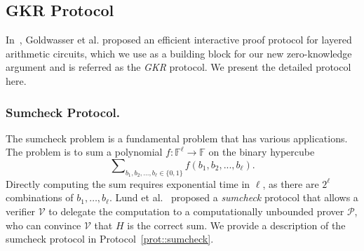 
\subsection{GKR Protocol}\label{subsec::GKR}

In~\cite{GKR}, Goldwasser et al. proposed an efficient interactive proof protocol for layered arithmetic circuits, which we use as a building block for our new zero-knowledge argument and is referred as the \emph{GKR} protocol. We present the detailed protocol here.



\subsubsection{Sumcheck Protocol.}
\label{subsec::sumcheck}
The sumcheck problem is a fundamental problem that has various applications. The problem is to sum a polynomial $f: \mathbb{F}^\ell \rightarrow \mathbb{F}$ on the binary hypercube $$\sum\nolimits_{b_1,b_2,\ldots,b_\ell\in\{0,1\}}f(b_1,b_2,...,b_\ell).$$ 
Directly computing the sum requires exponential time in $\ell$, as there are $2^\ell$ combinations of $b_1,\ldots,b_\ell$. Lund et al.~\cite{sumcheck} proposed a \emph{sumcheck} protocol that allows a verifier $\mathcal{V}$ to delegate the computation to a computationally unbounded prover $\mathcal{P}$, who can convince $\mathcal{V}$ that $H$ is the correct sum. We provide a description of the sumcheck protocol in Protocol~\ref{prot::sumcheck}.
\begin{figure}[t!]
\small{
}
\vspace{-0.2in}
\end{figure}
